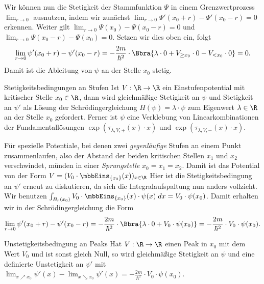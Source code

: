 \documentclass{subfiles}
\begin{document}
        Wir können nun die Stetigkeit der Stammfunktion $\Psi$ in einem Grenzwertprozess $\lim_{r\to 0}$ ausnutzen, indem wir zunächst $\lim_{r\to 0}\Psi'(x_0 + r) - \Psi'(x_0 - r) = 0$ erkennen. Weiter gilt $\lim_{r\to 0}\Psi(x_0) - \Psi(x_0 - r) = 0$ und $\lim_{r\to 0}\Psi(x_0 - r) - \Psi(x_0) = 0$. Setzen wir dies oben ein, folgt 
        \[
            \lim_{r\to 0}\psi'(x_0 + r)-\psi'(x_0 - r) = -\frac{2m}{\hbar^2}\cdot\Bbra{
                \lambda\cdot 0 + V_{\geq x_0}\cdot 0 - V_{<x_0}\cdot 0
            } = 0.
        \]
        Damit ist die Ableitung von $\psi$ an der Stelle $x_0$ stetig.

        \begin{mdef}{Stetigkeitsbedingungen an Stufen}
            Ist $V:\R\to\R$ ein Einstufenpotential mit kritischer Stelle $x_0\in\R$, dann wird gleichmäßige Stetigkeit an $\psi$ und Stetigkeit an $\psi'$ als Lösung der Schrödingergleichung $H(\psi) = \lambda\cdot\psi$ zum Eigenwert $\lambda\in\R$ an der Stelle $x_0$ gefordert. Ferner ist $\psi$ eine Verklebung von Linearkombinationen der Fundamentallösungen $\exp(\tau_{\lambda,V,+}(x)\cdot x)$ und $\exp(\tau_{\lambda,V,-}(x)\cdot x)$. 
        \end{mdef}
        Für spezielle Potentiale, bei denen zwei \emph{gegenläufige} Stufen an einem Punkt zusammenlaufen, also der Abstand der beiden kritischen Stellen $x_1$ und $x_2$ verschwindet, münden in einer \emph{Sprungstelle} $x_0 = x_1 = x_2$. Damit ist das Potential von der Form $V = (V_0\cdot\mbbEins_{\{x_0\}}(x))_{x\in\R}$ Hier ist die Stetigkeitsbedingung an $\psi'$ erneut zu diskutieren, da sich die Integralaufspaltung nun anders vollzieht. Wir benutzen $\int_{B_r(x_0)} V_0\cdot\mbbEins_{\{x_0\}}(x)\cdot\psi(x)\;dx = V_0\cdot\psi(x_0)$. Damit erhalten wir in der Schrödingergleichung die Form
        \[
            \lim_{r\to 0}\psi'(x_0 + r)-\psi'(x_0 - r) = -\frac{2m}{\hbar^2}\cdot\Bbra{
                \lambda\cdot 0 + V_0\cdot\psi(x_0)
            } = -\frac{2m}{\hbar^2}\cdot V_0\cdot\psi(x_0).
        \]
        \begin{mdef}{Unstetigkeitsbedingung an Peaks}
            Hat $V:\R\to\R$ einen Peak in $x_0$ mit dem Wert $V_0$ und ist sonst gleich Null, so wird gleichmäßige Stetigkeit an $\psi$ und eine definierte Unstetigkeit an $\psi'$ mit $\lim_{x\nearrow x_0}\psi'(x) - \lim_{x\searrow x_0}\psi'(x) = -\frac{2m}{\hbar^2}\cdot V_0\cdot\psi(x_0)$.
        \end{mdef}
\end{document}
